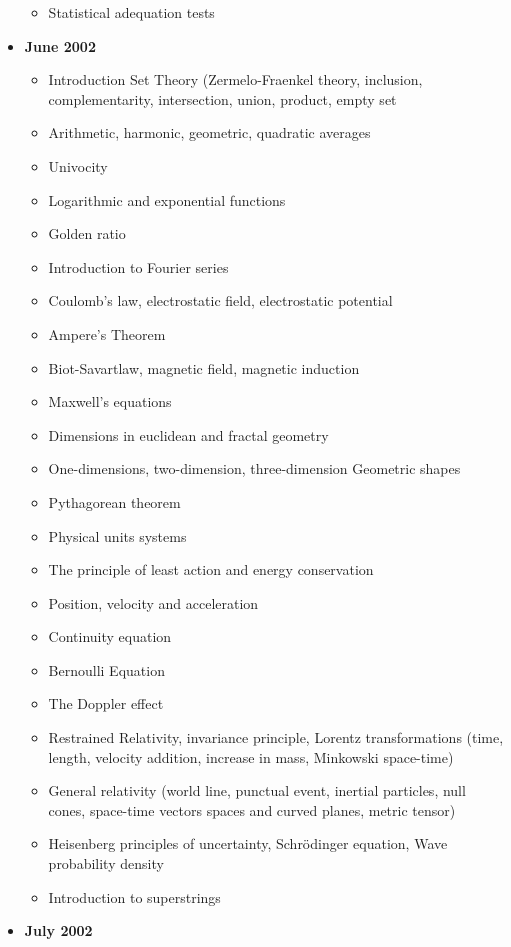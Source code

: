 \documentclass[12pt,a4paper,twoside,openright]{report}
\theoremstyle{definition}
\theoremstyle{itexmp}
\numberwithin{equation}{section}
\begin{document}
\begin{itemize}
\begin{itemize}[noitemsep]
				\item Statistical adequation tests
			\end{itemize}
		\item \textbf{June 2002}
			\begin{itemize}[noitemsep]
				\item Introduction Set Theory (Zermelo-Fraenkel theory, inclusion, complementarity, intersection, union, product, empty set
				\item Arithmetic, harmonic, geometric, quadratic averages
				\item Univocity
				\item Logarithmic and exponential functions
				\item Golden ratio
				\item Introduction to Fourier series
				\item Coulomb's law, electrostatic field, electrostatic potential
				\item Ampere's Theorem
				\item Biot-Savartlaw, magnetic field, magnetic induction
				\item Maxwell's equations
				\item Dimensions in euclidean and fractal geometry
				\item One-dimensions, two-dimension, three-dimension Geometric shapes
				\item Pythagorean theorem
				\item Physical units systems
				\item The principle of least action and energy conservation
				\item Position, velocity and acceleration
				\item Continuity equation
				\item Bernoulli Equation
				\item The Doppler effect
				\item Restrained Relativity, invariance principle, Lorentz transformations (time, length, velocity addition, increase in mass, Minkowski space-time)
				\item General relativity (world line, punctual event, inertial particles, null cones, space-time vectors spaces and curved planes, metric tensor)
				\item Heisenberg principles of uncertainty, Schrödinger equation, Wave probability density
				\item Introduction to superstrings
			\end{itemize}
		\item \textbf{July 2002}

\end{itemize}
\end{document}

